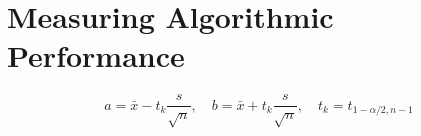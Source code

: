 \section{Measuring Algorithmic Performance} \label{sec:measuring_algorithmic_performance}

\[ a = \bar{x} - t_k\frac{s}{\sqrt{n}}, \quad
   b = \bar{x} + t_k\frac{s}{\sqrt{n}}, \quad
   t_k = t_{1-\alpha/2,n-1} \]


